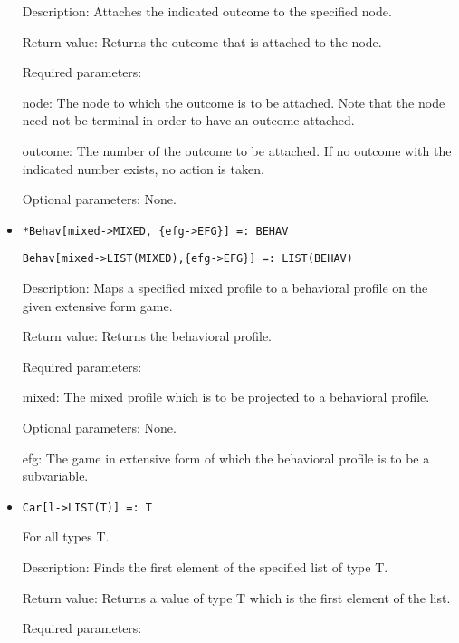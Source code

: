 \begin{itemize}
\bd
\item
[Description:] Attaches the indicated outcome to the specified node.
\item
[Return value:] Returns the outcome that is attached to the node. 
\item
[Required parameters:]\hfil\null

\bd
\item
[node:] The node to which the outcome is to be attached.  Note that the
node need not be terminal in order to have an outcome attached.
\item
[outcome:] The number of the outcome to be attached.  If no outcome with
the indicated number exists, no action is taken.
\ed

\item
[Optional parameters:] None.
\ed


\item
\protect \large \begin{verbatim}
*Behav[mixed->MIXED, {efg->EFG}] =: BEHAV
\end{verbatim}\normalsize


\protect \large \begin{verbatim}
Behav[mixed->LIST(MIXED),{efg->EFG}] =: LIST(BEHAV)
\end{verbatim}\normalsize

\bd
\item
[Description:] Maps a specified mixed profile to a behavioral
profile on the given extensive form game.
\item
[Return value:] Returns the behavioral profile.
\item
[Required parameters:]\hfil\null

\bd
\item
[mixed:] The mixed profile which is to be projected to a behavioral
profile.
\ed

\item
[Optional parameters:] None.
\bd
\item
[efg:] The game in extensive form of which the behavioral profile is
to be a subvariable.
\ed
\ed



\item
\protect \large \begin{verbatim}
Car[l->LIST(T)] =: T
\end{verbatim}\normalsize

For all types T.

\bd
\item
[Description:] Finds the first element of the specified list of type
T.
\item
[Return value:] Returns a value of type T which is the first element
of the list.
\item 
[Required parameters:]\hfil\null
	

\end{itemize}
